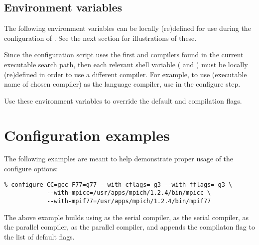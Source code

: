 \subsection*{Environment variables}


\noindent The following environment variables can be locally (re)defined for use 
during the configuration of {\sundials}. See the next section for illustrations of these.

\begin{config}

\item {}

\item {}

  Since the configuration script uses the first {\C} and {\F} compilers found in
  the current executable search path, then each relevant shell variable (
  and ) must be locally (re)defined in order to use a different compiler. 
  For example, to use  (executable name of chosen compiler) as the {\C}
  language compiler, use  in the configure step.

\item {}

\item {}

  Use these environment variables to override the default {\C} and {\F}
  compilation flags.

\end{config}



\section{Configuration examples}

The following examples are meant to help demonstrate proper usage of the configure options:

\begin{verbatim}
% configure CC=gcc F77=g77 --with-cflags=-g3 --with-fflags=-g3 \
            --with-mpicc=/usr/apps/mpich/1.2.4/bin/mpicc \ 
            --with-mpif77=/usr/apps/mpich/1.2.4/bin/mpif77
\end{verbatim}

\noindent The above example builds {\sundials} using  as the serial {\C}
compiler, \id{g77} as the serial {\F} compiler, \id{mpicc} as the parallel {\C}
compiler, \id{mpif77} as the parallel {\F} compiler, and appends the \id{-g3}
compilaton flag to the list of default flags.

